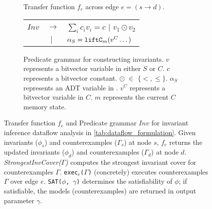 \begin{figure}[H]
\begin{center}
\begin{subfigure}{.58\textwidth}
\begin{algorithm}[H]
\begin{footnotesize}
\SetAlgoLined
{}
\end{footnotesize}
\end{algorithm}
\caption{\label{algo:tf} Transfer function $f_e$ across
edge $e=(s\rightarrow d)$.}
\end{subfigure}%
\hfill
{}
\hfill
\begin{subfigure}{.40\textwidth}
\begin{center}
\begin{footnotesize}
\begin{tabular}{p{0.45cm}p{0.15cm}l}
${Inv}$ & $\rightarrow$ & $\sum_{i}{c_i v_i}=c$ $|$ $v_1 \odot v_2$  \\
& $\ \ |$ & $\alpha_S = {\tt liftC}_m(v^C \dots)$ \\
\end{tabular}
\end{footnotesize}
\end{center}
\caption{\label{fig:invGrammar}\footnotesize Predicate grammar for constructing invariants. $v$ represents a bitvector variable in either $S$ or $C$. $c$ represents a bitvector constant. $\odot$ $\in$ $\{<,\leq\}$. $\alpha_S$ represents an ADT variable in \SpecL{}. $v^{C}$ represents a bitvector variable in $C$. $m$ represents the current $C$ memory state.}
\end{subfigure}%
\caption{Transfer function $f_e$ and Predicate grammar $Inv$ for invariant inference dataflow analysis in \cref{tab:dataflow_formulation}.
Given invariants ($\phi_{s}$) and counterexamples ($\Gamma_{s}$) at node $s$,
$f_e$ returns the updated
invariants ($\phi_{d}$) and counterexamples ($\Gamma_{d}$) at
node $d$.
{\em StrongestInvCover($\Gamma$)} computes the strongest invariant cover for counterexamples $\Gamma$.
{\tt exec$_e$($\Gamma$)} (concretely) executes
counterexamples $\Gamma$ over edge $e$.
{\tt SAT($\phi$, $\gamma$)} determines
the satisfiability of $\phi$; if satisfiable, the models (counterexamples) are returned in output parameter $\gamma$.}
\end{center}
\end{figure}